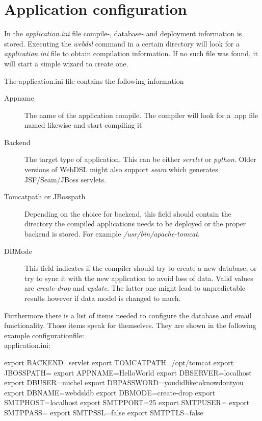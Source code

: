 \section{Application configuration} 
In the \emph{application.ini} file compile-, database- and deployment information is stored. Executing the \emph{webdsl} command in a certain directory will look for a \emph{application.ini} file to obtain compilation information. If no such file was found, it will start a simple wizard to create one. 

The application.ini file contains the following information
\begin{description}
	\item[Appname]The name of the application compile. The compiler will look for a .app file named likewise and start compiling it
	\item[Backend]The target type of application. This can be either \emph{servlet} or \emph{python}. Older versions of WebDSL might also support \emph{seam} which generates JSF/Seam/JBoss servlets. 
	\item[Tomcatpath or JBosspath] Depending on the choice for backend, this field should contain the directory the compiled applications needs to be deployed or the proper backend is stored. For example \emph{/usr/bin/apache-tomcat}.
	\item[DBMode]This field indicates if the compiler should try to create a new database, or try to sync it with the new application to avoid loss of data. Valid values are \emph{create-drop} and \emph{update}. The latter one might lead to unpredictable results however if data model is changed to much. 
\end{description}
Furthermore there is a list of items needed to configure the database and email functionality. Those items speak for themselves. They are shown in the following example configurationfile:
\\application.ini:
\begin{shell}
export BACKEND=servlet
export TOMCATPATH=/opt/tomcat
export JBOSSPATH=
export APPNAME=HelloWorld
export DBSERVER=localhost
export DBUSER=michel
export DBPASSWORD=youdidliketoknowdontyou
export DBNAME=webdsldb
export DBMODE=create-drop
export SMTPHOST=localhost
export SMTPPORT=25
export SMTPUSER=
export SMTPPASS=
export SMTPSSL=false
export SMTPTLS=false
\end{shell}

